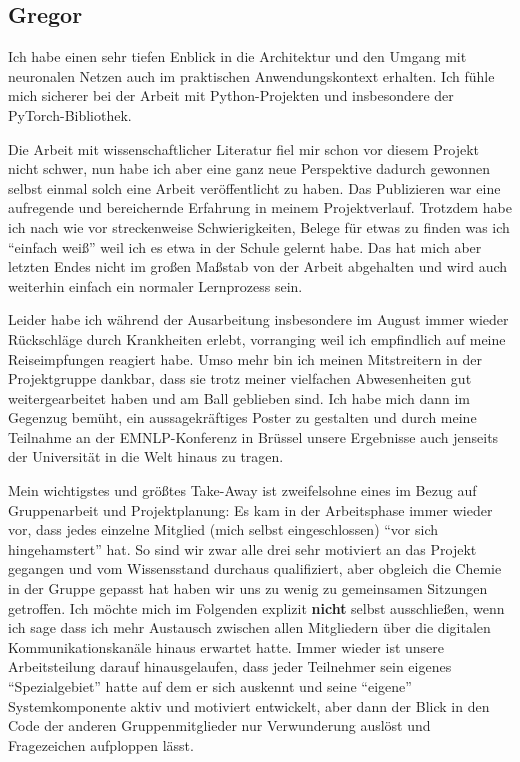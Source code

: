 \documentclass[11pt,a4paper]{article}
\begin{document}
\subsection{Gregor}
Ich habe einen sehr tiefen Enblick in die Architektur und den Umgang mit neuronalen Netzen auch im praktischen Anwendungskontext erhalten. Ich fühle mich sicherer bei der Arbeit mit Python-Projekten und insbesondere der PyTorch-Bibliothek.

Die Arbeit mit wissenschaftlicher Literatur fiel mir schon vor diesem Projekt nicht schwer, nun habe ich aber eine ganz neue Perspektive dadurch gewonnen selbst einmal solch eine Arbeit veröffentlicht zu haben. Das Publizieren war eine aufregende und bereichernde Erfahrung in meinem Projektverlauf.
Trotzdem habe ich nach wie vor streckenweise Schwierigkeiten, Belege für etwas zu finden was ich \enquote{einfach weiß} weil ich es etwa in der Schule gelernt habe. Das hat mich aber letzten Endes nicht im großen Maßstab von der Arbeit abgehalten und wird auch weiterhin einfach ein normaler Lernprozess sein.

Leider habe ich während der Ausarbeitung insbesondere im August immer wieder Rückschläge durch Krankheiten erlebt, vorranging weil ich empfindlich auf meine Reiseimpfungen reagiert habe. Umso mehr bin ich meinen Mitstreitern in der Projektgruppe dankbar, dass sie trotz meiner vielfachen Abwesenheiten gut weitergearbeitet haben und am Ball geblieben sind. Ich habe mich dann im Gegenzug bemüht, ein aussagekräftiges Poster zu gestalten und durch meine Teilnahme an der EMNLP-Konferenz in Brüssel unsere Ergebnisse auch jenseits der Universität in die Welt hinaus zu tragen.

Mein wichtigstes und größtes Take-Away ist zweifelsohne eines im Bezug auf Gruppenarbeit und Projektplanung: Es kam in der Arbeitsphase immer wieder vor, dass jedes einzelne Mitglied (mich selbst eingeschlossen) \enquote{vor sich hingehamstert} hat. So sind wir zwar alle drei sehr motiviert an das Projekt gegangen und vom Wissensstand durchaus qualifiziert, aber obgleich die Chemie in der Gruppe gepasst hat haben wir uns zu wenig zu gemeinsamen Sitzungen getroffen. Ich möchte mich im Folgenden explizit \textbf{nicht} selbst ausschließen, wenn ich sage dass ich mehr Austausch zwischen allen Mitgliedern über die digitalen Kommunikationskanäle hinaus erwartet hatte. Immer wieder ist unsere Arbeitsteilung darauf hinausgelaufen, dass jeder Teilnehmer sein eigenes \enquote{Spezialgebiet} hatte auf dem er sich auskennt und seine \enquote{eigene} Systemkomponente aktiv und motiviert entwickelt, aber dann der Blick in den Code der anderen Gruppenmitglieder nur Verwunderung auslöst und Fragezeichen aufploppen lässt.
\end{document}
